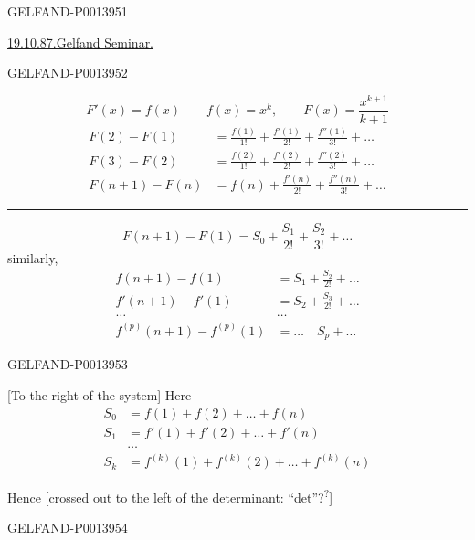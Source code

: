 \begin{GelfandAdjacentEvidence}{GELFAND-P001395}{1}

\uline{19.10.87.}\quad \uline{Gelfand Seminar.}

\quad {}

\end{GelfandAdjacentEvidence}
\begin{GelfandAdjacentEvidence}{GELFAND-P001395}{2}


\[
F'(x)=f(x)\qquad f(x)=x^k,\qquad F(x)=\frac{x^{k+1}}{k+1}
\]
\begin{align*}
F(2)-F(1)&=\frac{f(1)}{1!}+\frac{f'(1)}{2!}+\frac{f''(1)}{3!}+\ldots\\
F(3)-F(2)&=\frac{f(2)}{1!}+\frac{f'(2)}{2!}+\frac{f''(2)}{3!}+\ldots\\[8pt]
F(n+1)-F(n)&=f(n)+\frac{f'(n)}{2!}+\frac{f''(n)}{3!}+\ldots
\end{align*}
\rule{9cm}{.3pt}
\[
F(n+1)-F(1)=S_0+\frac{S_1}{2!}+\frac{S_2}{3!}+\ldots
\]
similarly,
\begin{align*}
f(n+1)-f(1)&=S_1+\frac{S_2}{2!}+\ldots\\
f'(n+1)-f'(1)&=S_2+\frac{S_3}{2!}+\ldots\\
\ldots\qquad&\ldots\\
f^{(p)}(n+1)-f^{(p)}(1)&=\ldots\quad S_p+\ldots
\end{align*}
\end{GelfandAdjacentEvidence}
\begin{GelfandAdjacentEvidence}{GELFAND-P001395}{3}


[To the right of the system] Here
\begin{align*}
S_0&=f(1)+f(2)+\ldots+f(n)\\
S_1&=f'(1)+f'(2)+\ldots+f'(n)\\
&\ldots\\
S_k&=f^{(k)}(1)+f^{(k)}(2)+\ldots+f^{(k)}(n)
\end{align*}

Hence
[crossed out to the left of the determinant:
“det”?\textsuperscript{?}]
\end{GelfandAdjacentEvidence}
\begin{GelfandAdjacentEvidence}{GELFAND-P001395}{4}

\end{GelfandAdjacentEvidence}
